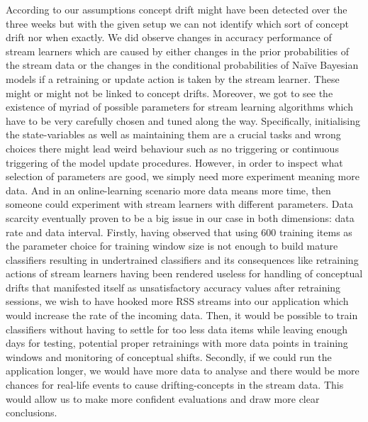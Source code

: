 \documentclass{article} %
\begin{document}
According to our assumptions concept drift might have been detected over the three weeks but with the given setup we can not identify which sort of concept drift nor when exactly. We did observe changes in accuracy performance of stream learners which are caused by either changes in the prior probabilities of the stream data or the changes in the conditional probabilities of Na\"ive Bayesian models if a retraining or update action is taken by the stream learner. These might or might not be linked to concept drifts. 
Moreover, we got to see the existence of myriad of possible parameters for stream learning algorithms which have to be very carefully chosen and tuned along the way. Specifically, initialising the state-variables as well as maintaining them are a crucial tasks and wrong choices there might lead weird behaviour such as no triggering or continuous triggering of the model update procedures. However, in order to inspect what selection of parameters are good, we simply need more experiment meaning more data. And in an online-learning scenario more data means more time, then someone could experiment with stream learners with different parameters. Data scarcity eventually proven to be a big issue in our case in both dimensions: data rate and data interval. Firstly, having observed that using 600 training items as the parameter choice for training window size is not enough to build mature classifiers resulting in undertrained classifiers and its consequences like retraining actions of stream learners having been rendered useless for handling of conceptual drifts that manifested itself as unsatisfactory accuracy values after retraining sessions, we wish to have hooked more RSS streams into our application which would increase the rate of the incoming data. Then, it would be possible to train classifiers without having to settle for too less data items while leaving enough days for testing, potential proper retrainings with more data points in training windows and monitoring of conceptual shifts. Secondly, if we could run the application longer, we would have more data to analyse and there would be more chances for real-life events to cause drifting-concepts in the stream data. This would allow us to  make more confident evaluations and draw more clear conclusions.








\small{

}
\end{document}
